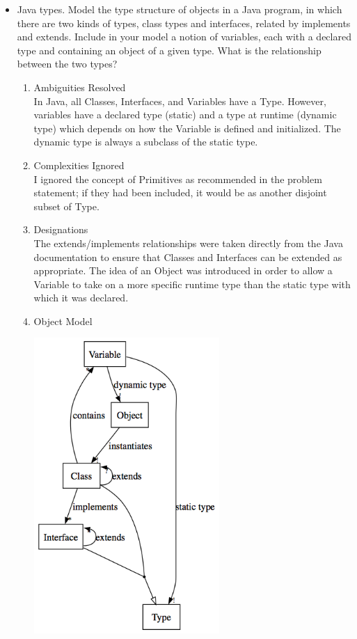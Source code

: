 \documentclass[11pt,letterpaper]{article}
\begin{document}
\begin{itemize}
\item Java types. Model the type structure of objects in a Java program, in which there are two kinds of types, class types and interfaces, related by implements and extends. Include in your model a notion of variables, each with a declared type and containing an object of a given type. What is the relationship between the two types?\\

\begin{enumerate}
\item Ambiguities Resolved\\
In Java, all Classes, Interfaces, and Variables have a Type. However, variables have a declared type (static) and a type at runtime (dynamic type) which depends on how the Variable is defined and initialized. The dynamic type is always a subclass of the static type.
\item Complexities Ignored\\
I ignored the concept of Primitives as recommended in the problem statement; if they had been included, it would be as another disjoint subset of Type.
\item Designations\\
The extends/implements relationships were taken directly from the Java documentation to ensure that Classes and Interfaces can be extended as appropriate.
The idea of an Object was introduced in order to allow a Variable to take on a more specific runtime type than the static type with which it was declared.
\item Object Model\\
\begin{center}
\includegraphics[width=200pt]{dot/b4.png}
\label{fig:ob4} 
\end{center}
\end{enumerate}

\end{itemize}
\end{document}
